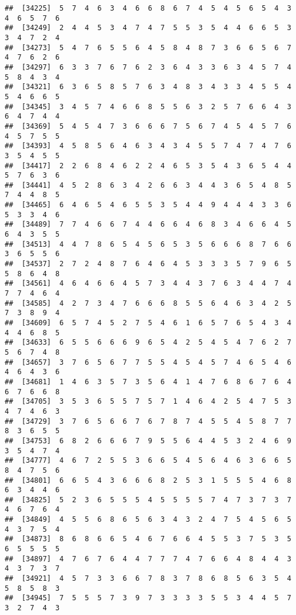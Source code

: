 \documentclass[
]{book}
\begin{document}
\begin{verbatim}
##  [34225]  5  7  4  6  3  4  6  6  8  6  7  4  5  4  5  6  5  4  3  4  6  5  7  6
##  [34249]  2  4  4  5  3  4  7  4  7  5  5  3  5  4  4  6  6  5  3  3  4  7  2  4
##  [34273]  5  4  7  6  5  5  6  4  5  8  4  8  7  3  6  6  5  6  7  4  7  6  2  6
##  [34297]  6  3  3  7  6  7  6  2  3  6  4  3  3  6  3  4  5  7  4  5  8  4  3  4
##  [34321]  6  3  6  5  8  5  7  6  3  4  8  3  4  3  3  4  5  5  4  5  4  6  6  5
##  [34345]  3  4  5  7  4  6  6  8  5  5  6  3  2  5  7  6  6  4  3  6  4  7  4  4
##  [34369]  5  4  5  4  7  3  6  6  6  7  5  6  7  4  5  4  5  7  6  4  5  7  5  5
##  [34393]  4  5  8  5  6  4  6  3  4  3  4  5  5  7  4  7  4  7  6  3  5  4  5  5
##  [34417]  2  2  6  8  4  6  2  2  4  6  5  3  5  4  3  6  5  4  4  5  7  6  3  6
##  [34441]  4  5  2  8  6  3  4  2  6  6  3  4  4  3  6  5  4  8  5  7  4  4  8  5
##  [34465]  6  4  6  5  4  6  5  5  3  5  4  4  9  4  4  4  3  3  6  5  3  3  4  6
##  [34489]  7  7  4  6  6  7  4  4  6  6  4  6  8  3  4  6  6  4  5  6  4  3  5  5
##  [34513]  4  4  7  8  6  5  4  5  6  5  3  5  6  6  6  8  7  6  6  3  6  5  5  6
##  [34537]  2  7  2  4  8  7  6  4  6  4  5  3  3  3  5  7  9  6  5  5  8  6  4  8
##  [34561]  4  6  4  6  6  4  5  7  3  4  4  3  7  6  3  4  4  7  4  7  7  4  6  4
##  [34585]  4  2  7  3  4  7  6  6  6  8  5  5  6  4  6  3  4  2  5  7  3  8  9  4
##  [34609]  6  5  7  4  5  2  7  5  4  6  1  6  5  7  6  5  4  3  4  4  4  6  8  5
##  [34633]  6  5  5  6  6  6  9  6  5  4  2  5  4  5  4  7  6  2  7  5  6  7  4  8
##  [34657]  3  7  6  5  6  7  7  5  5  4  5  4  5  7  4  6  5  4  6  4  6  4  3  6
##  [34681]  1  4  6  3  5  7  3  5  6  4  1  4  7  6  8  6  7  6  4  6  7  6  6  8
##  [34705]  3  5  3  6  5  5  7  5  7  1  4  6  4  2  5  4  7  5  3  4  7  4  6  3
##  [34729]  3  7  6  5  6  6  7  6  7  8  7  4  5  5  4  5  8  7  7  8  3  6  5  5
##  [34753]  6  8  2  6  6  6  7  9  5  5  6  4  4  5  3  2  4  6  9  3  5  4  7  4
##  [34777]  4  6  7  2  5  5  3  6  6  5  4  5  6  4  6  3  6  6  5  8  4  7  5  6
##  [34801]  6  6  5  4  3  6  6  6  8  2  5  3  1  5  5  5  4  6  8  6  3  4  4  6
##  [34825]  5  2  3  6  5  5  5  4  5  5  5  5  7  4  7  3  7  3  7  4  6  7  6  4
##  [34849]  4  5  5  6  8  6  5  6  3  4  3  2  4  7  5  4  5  6  5  4  3  7  5  4
##  [34873]  8  6  8  6  6  5  4  6  7  6  6  4  5  5  3  7  5  3  5  6  5  5  5  5
##  [34897]  4  7  6  7  6  4  4  7  7  7  4  7  6  6  4  8  4  4  3  4  3  7  3  7
##  [34921]  4  5  7  3  3  6  6  7  8  3  7  8  6  8  5  6  3  5  4  5  8  5  8  3
##  [34945]  7  5  5  5  7  3  9  7  3  3  3  3  5  5  3  4  4  5  7  3  2  7  4  3

\end{verbatim}
\end{document}
